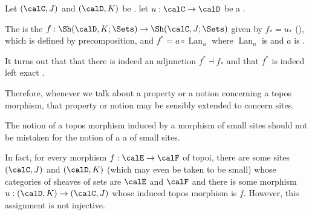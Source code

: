\begin{definition} \label{definition:topos_morphism_induced_by_a_morphism_of_small_sites}
    Let $(\calC,J)$ and $(\calD,K)$ be . let $u: \calC \to \calD$ be a .

    The  is the  $f: \Sh(\calD, K; \Sets) \to \Sh(\calC, J; \Sets)$ given by $f_* = u_*$ (), which is defined by precomposition, and $f^* = a \circ \operatorname{Lan}_u$ where $\operatorname{Lan}_u$ is  and $a$ is . 

    It turns out that that there is indeed an adjunction $f^* \dashv f_*$  and that $f^*$ is indeed left exact .

    Therefore, whenever we talk about a property or a notion concerning a topos morphism, that property or notion may be sensibly extended to concern sites.

    The notion of a topos morphism induced by a morphism of small sites should not be mistaken for the notion of a  a   of small sites.

\end{definition}
\begin{remark}
    In fact, for every morphism $f: \calE \to \calF$ of topoi, there are some sites $(\calC, J)$ and $(\calD, K)$ (which may even be taken to be small) whose categories of sheaves of sets are $\calE$ and $\calF$ and there is some morphism $u: (\calD, K) \to (\calC, J)$ whose induced topos morphism is $f$. However, this assignment is not injective.
\end{remark}